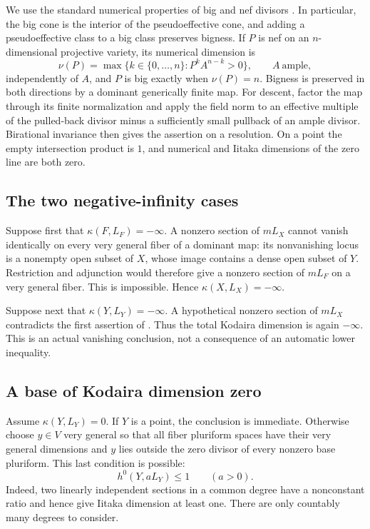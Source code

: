 We use the standard numerical properties of big and nef divisors
\cite[Chapters 1--2]{Lazarsfeld}.  In particular, the big cone is the
interior of the pseudoeffective cone, and adding a pseudoeffective class
to a big class preserves bigness.  If $P$ is nef on an $n$-dimensional
projective variety, its numerical dimension is
\begin{equation}\label{eq:prelim-numerical-dimension}
 \nu(P)=\max\{k\in\{0,\ldots,n\}:P^k A^{n-k}>0\},
 \qquad A\ \text{ample},
\end{equation}
independently of $A$, and $P$ is big exactly when $\nu(P)=n$.
Bigness is preserved in both directions by a dominant generically finite
map.  For descent, factor the map through its finite normalization and
apply the field norm to an effective multiple of the pulled-back divisor
minus a sufficiently small pullback of an ample divisor.  Birational
invariance then gives the assertion on a resolution.  On a point the empty
intersection product is $1$, and numerical and Iitaka dimensions of the
zero line are both zero.

\subsection{The two negative-infinity cases}

\label{proof:fiber-vanishing}
Suppose first that $\kappa(F,L_F)=-\infty$. A nonzero section of $mL_X$
cannot vanish identically on every very general fiber of a dominant map:
its nonvanishing locus is a nonempty open subset of $X$, whose image
contains a dense open subset of $Y$. Restriction and adjunction would
therefore give a nonzero section of $mL_F$ on a very general fiber. This is
impossible. Hence $\kappa(X,L_X)=-\infty$.

\label{proof:base-vanishing}
Suppose next that $\kappa(Y,L_Y)=-\infty$. A hypothetical nonzero section
of $mL_X$ contradicts the first assertion of
.
Thus the total Kodaira dimension is again $-\infty$. This is an actual
vanishing conclusion, not a consequence of an automatic lower inequality.

\subsection{A base of Kodaira dimension zero}

Assume $\kappa(Y,L_Y)=0$. If $Y$ is a point, the conclusion is immediate.
Otherwise choose $y\in V$ very general so that all fiber pluriform spaces
have their very general dimensions and $y$ lies outside the zero divisor
of every nonzero base pluriform. This last condition is possible:
\begin{equation}\label{eq:base-one-section}
 h^0(Y,aL_Y)\leq 1\qquad(a>0).
\end{equation}
Indeed, two linearly independent sections in a common degree have a
nonconstant ratio and hence give Iitaka dimension at least one. There are
only countably many degrees to consider.

